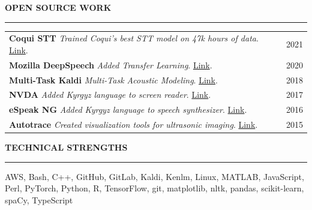 \documentclass{cv} %
\begin{document}
\vspace{.5cm}
\sectionskip
\MakeUppercase{\textbf{Open Source Work}}
  \sectionlineskip
  \hrule
\vspace{.5cm}

\renewcommand{\arraystretch}{1.5} %
\begin{tabular}{@{}p{}p{}@{}}
  {\textbf{Coqui STT}} {\hfill \textit{Trained Coqui's best STT model on 47k hours of data}}.   \href{https://github.com/coqui-ai/STT/releases/tag/v1.0.0}{Link}.
  &
  \hfill 2021
  \\
  {\textbf{Mozilla DeepSpeech}} {\hfill \textit{Added Transfer Learning}}.  \href{https://github.com/mozilla/DeepSpeech/releases/tag/v0.7.0}{Link}.
  &
  \hfill 2020
  \\
  {\textbf{Multi-Task Kaldi}} {\hfill \textit{Multi-Task Acoustic Modeling}}.  \href{https://github.com/JRMeyer/multi-task-kaldi}{Link}.
  &
  \hfill 2018
  \\
  {\textbf{NVDA}} {\hfill \textit{Added Kyrgyz language to screen reader}}.  \href{https://github.com/JRMeyer/nvda}{Link}.
  &
  \hfill 2017
  \\
  {\textbf{eSpeak NG}} {\hfill \textit{Added Kyrgyz language to speech synthesizer}}.  \href{https://github.com/rhdunn/espeak/commits?author=JRMeyer}{Link}.
  &
  \hfill 2016
  \\
  {\textbf{Autotrace}} {\hfill \textit{Created visualization tools for ultrasonic imaging}}.  \href{https://github.com/JRMeyer/Autotrace}{Link}.
  &
  \hfill 2015
\end{tabular}










\vspace{.5cm}
\sectionskip
\MakeUppercase{\textbf{Technical Strengths}}
  \sectionlineskip
  \hrule
\vspace{.5cm}

AWS, Bash, C++, GitHub, GitLab, Kaldi, Kenlm, Linux, MATLAB, JavaScript, Perl, PyTorch, Python, R, TensorFlow, git, matplotlib, nltk, pandas, scikit-learn, spaCy, TypeScript \\
\end{document}
